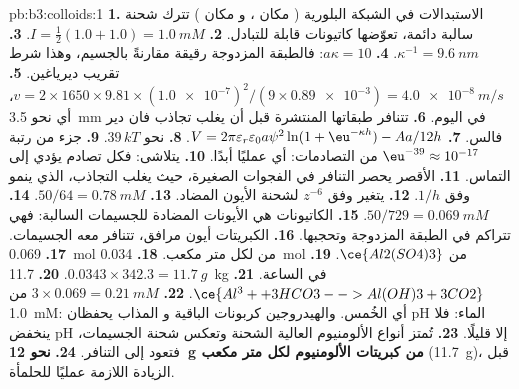 \begin{solution}{pb:b3:colloids:1}
\textbf{1.} الاستبدالات في الشبكة البلورية ( مكان ، و مكان ) تترك
شحنة سالبة دائمة، تعوّضها كاتيونات قابلة للتبادل.
\textbf{2.} $I = \frac12(1.0 + 1.0) = \qty{1.0}{mM}$.
\textbf{3.} $\kappa^{-1} = \qty{9.6}{nm}$.
\textbf{4.} $a\kappa = 10$: فالطبقة المزدوجة رقيقة مقارنةً بالجسيم، وهذا
شرط تقريب ديرياغين.
\textbf{5.} $v = 2 \times 1650 \times 9.81 \times (\num{1.0e-7})^2/(9 \times \num{0.89e-3}) = \qty{4.0e-8}{m/s}$، أي نحو \qty{3.5}{mm} في اليوم.
\textbf{6.} تتنافر طبقاتها المنتشرة قبل أن يغلب تجاذب فان دير فالس.
\textbf{7.} $V = 2\pi\varepsilon_r\varepsilon_0a\psi^2\ln(1 + \eu^{-\kappa h}) - Aa/12h$.
\textbf{8.} نحو $39\,kT$.
\textbf{9.} جزء من رتبة $\eu^{-39} \approx 10^{-17}$ من التصادمات: أي عمليًا أبدًا.
\textbf{10.} يتلاشى: فكل تصادم يؤدي إلى التماس.
\textbf{11.}  الأقصر يحصر التنافر في الفجوات الصغيرة، حيث يغلب
التجاذب، الذي ينمو وفق $1/h$.
\textbf{12.} يتغير  وفق $z^{-6}$ لشحنة الأيون المضاد.
\textbf{13.} $50/64 = \qty{0.78}{mM}$.
\textbf{14.} $50/729 = \qty{0.069}{mM}$.
\textbf{15.} الكاتيونات هي الأيونات المضادة للجسيمات السالبة: فهي
تتراكم في الطبقة المزدوجة وتحجبها.
\textbf{16.} الكبريتات أيون مرافق، تتنافر معه الجسيمات.
\textbf{17.} \qty{0.069}{mol} من  لكل متر مكعب.
\textbf{18.} \qty{0.034}{mol} من $\ce{Al2(SO4)3}$.
\textbf{19.} $0.0343 \times 342.3 = \qty{11.7}{g}$.
\textbf{20.} \qty{11.7}{kg} في الساعة.
\textbf{21.} $\ce{Al^3+ + 3 HCO3- -> Al(OH)3 + 3 CO2}$.
\textbf{22.} $3 \times 0.069 = \qty{0.21}{mM}$ من \qty{1.0}{mM}: أي الخُمس. والهيدروجين كربونات الباقية
و المذاب يحفظان pH الماء: فلا ينخفض pH إلا
قليلًا.
\textbf{23.} تُمتز أنواع الألومنيوم العالية الشحنة وتعكس شحنة
الجسيمات، فتعود إلى التنافر.
\textbf{24.} \textbf{نحو \qty{12}{g} من كبريتات الألومنيوم لكل متر مكعب} (\qty{11.7}{g})، قبل الزيادة
اللازمة عمليًا للحلمأة.
\end{solution}
